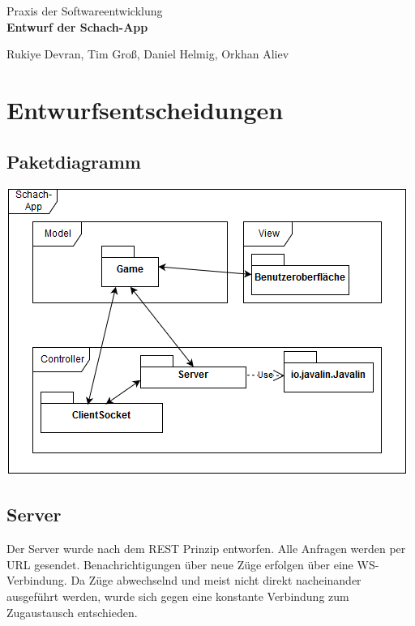 \documentclass[parskip=full]{scrartcl}
\begin{document}
	\begin{titlepage}
			
		\centering
		\vspace*{0.2\textheight}
		{\Large Praxis der Softwareentwicklung}\\[\baselineskip]
		\vspace{2cm}
		{\Huge \textbf{Entwurf der Schach-App}}\\[\baselineskip]\par
		\vspace{2cm}
		{\LARGE Rukiye Devran, Tim Groß, Daniel Helmig, Orkhan Aliev}\par		
		\newpage	
		\tableofcontents
		\pagebreak
		
	\end{titlepage}
	\section{Entwurfsentscheidungen}
		\subsection{Paketdiagramm}
		\begin{minipage}{\linewidth}
			\centering
			\includegraphics[width=1\linewidth]{Diagramme/Paketdiagramm}
			\label{fig:Paketdiagramm}
		\end{minipage}
		
		\subsection{Server}
		Der Server wurde nach dem \gls{REST} Prinzip entworfen. Alle Anfragen werden per \gls{URL} gesendet. Benachrichtigungen über neue Züge erfolgen über eine \gls{WS}-Verbindung. Da Züge abwechselnd und meist nicht direkt nacheinander ausgeführt werden, wurde sich gegen eine konstante Verbindung zum Zugaustausch entschieden.
		
\end{document}
